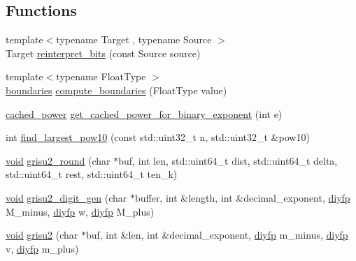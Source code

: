 \subsection*{Functions}
\begin{DoxyCompactItemize}
\item 
{\footnotesize template$<$typename Target , typename Source $>$ }\\Target \mbox{\hyperlink{namespacenlohmann_1_1detail_1_1dtoa__impl_a1c5d30eb51e5e994a3f48bde104d2ce8}{reinterpret\+\_\+bits}} (const Source source)
\item 
{\footnotesize template$<$typename Float\+Type $>$ }\\\mbox{\hyperlink{structnlohmann_1_1detail_1_1dtoa__impl_1_1boundaries}{boundaries}} \mbox{\hyperlink{namespacenlohmann_1_1detail_1_1dtoa__impl_a22b6e37654ac93c6d0d9c06ec1bf5ded}{compute\+\_\+boundaries}} (Float\+Type value)
\item 
\mbox{\hyperlink{structnlohmann_1_1detail_1_1dtoa__impl_1_1cached__power}{cached\+\_\+power}} \mbox{\hyperlink{namespacenlohmann_1_1detail_1_1dtoa__impl_adbf329a18c5cf854a3477327afd2200b}{get\+\_\+cached\+\_\+power\+\_\+for\+\_\+binary\+\_\+exponent}} (int e)
\item 
int \mbox{\hyperlink{namespacenlohmann_1_1detail_1_1dtoa__impl_a36ded358763b5dbcea9867660fbe4e28}{find\+\_\+largest\+\_\+pow10}} (const std\+::uint32\+\_\+t n, std\+::uint32\+\_\+t \&pow10)
\item 
\mbox{\hyperlink{namespacenlohmann_1_1detail_a59fca69799f6b9e366710cb9043aa77d}{void}} \mbox{\hyperlink{namespacenlohmann_1_1detail_1_1dtoa__impl_a5bc841e0bee12fd6489d49cf7bd07bb4}{grisu2\+\_\+round}} (char $\ast$buf, int len, std\+::uint64\+\_\+t dist, std\+::uint64\+\_\+t delta, std\+::uint64\+\_\+t rest, std\+::uint64\+\_\+t ten\+\_\+k)
\item 
\mbox{\hyperlink{namespacenlohmann_1_1detail_a59fca69799f6b9e366710cb9043aa77d}{void}} \mbox{\hyperlink{namespacenlohmann_1_1detail_1_1dtoa__impl_a9b899c72b0e1e3dd46d75c2b4e6bcdfb}{grisu2\+\_\+digit\+\_\+gen}} (char $\ast$buffer, int \&length, int \&decimal\+\_\+exponent, \mbox{\hyperlink{structnlohmann_1_1detail_1_1dtoa__impl_1_1diyfp}{diyfp}} M\+\_\+minus, \mbox{\hyperlink{structnlohmann_1_1detail_1_1dtoa__impl_1_1diyfp}{diyfp}} w, \mbox{\hyperlink{structnlohmann_1_1detail_1_1dtoa__impl_1_1diyfp}{diyfp}} M\+\_\+plus)
\item 
\mbox{\hyperlink{namespacenlohmann_1_1detail_a59fca69799f6b9e366710cb9043aa77d}{void}} \mbox{\hyperlink{namespacenlohmann_1_1detail_1_1dtoa__impl_a05b681dcb8569b9784c6dccfadb01633}{grisu2}} (char $\ast$buf, int \&len, int \&decimal\+\_\+exponent, \mbox{\hyperlink{structnlohmann_1_1detail_1_1dtoa__impl_1_1diyfp}{diyfp}} m\+\_\+minus, \mbox{\hyperlink{structnlohmann_1_1detail_1_1dtoa__impl_1_1diyfp}{diyfp}} v, \mbox{\hyperlink{structnlohmann_1_1detail_1_1dtoa__impl_1_1diyfp}{diyfp}} m\+\_\+plus)

\end{DoxyCompactItemize}
